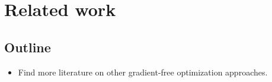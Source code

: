 \chapter{Related work}
\label{chap:related-work}

\section{Outline}
\begin{itemize}
    \item
        Find more literature on other gradient-free optimization
        approaches.
\end{itemize}